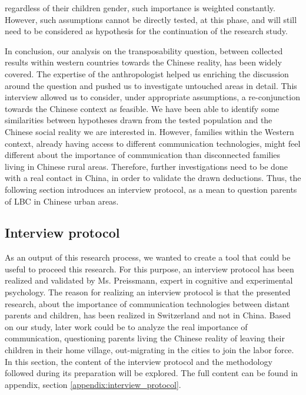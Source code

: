 regardless of their children gender, such importance is weighted constantly. However, such assumptions cannot be directly tested, at this phase, and will still need to be considered as hypothesis for the continuation of the research study.

In conclusion, our analysis on the transposability question, between collected results within western countries towards the Chinese reality, has been widely covered. The expertise of the anthropologist helped us enriching the discussion around the question and pushed us to investigate untouched areas in detail. This interview allowed us to consider, under appropriate assumptions, a re-conjunction towards the Chinese context as feasible. We have been able to identify some similarities between hypotheses drawn from the tested population and the Chinese social reality we are interested in. However, families within the Western context, already having access to different communication technologies, might feel different about the importance of communication than disconnected families living in Chinese rural areas. Therefore, further investigations need to be done with a real contact in China, in order to validate the drawn deductions. Thus, the following section introduces an interview protocol, as a mean to question parents of LBC in Chinese urban areas. 

\subsection{Interview protocol}
\label{interview-protocol}

As an output of this research process, we wanted to create a tool that could be useful to proceed this research. For this purpose, an interview protocol has been realized and validated by Ms. Preissmann, expert in cognitive and experimental psychology. The reason for realizing an interview protocol is that the presented research, about the importance of communication technologies between distant parents and children, has been realized in Switzerland and not in China. Based on our study, later work could be to analyze the real importance of communication, questioning parents living the Chinese reality of leaving their children in their home village, out-migrating in the cities to join the labor force. In this section, the content of the interview protocol and the methodology followed during its preparation will be explored. The full content can be found in appendix, section \ref{appendix:interview_protocol}.

